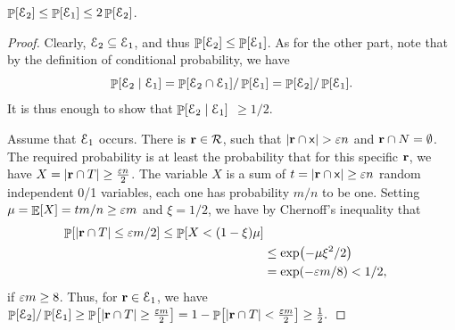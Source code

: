 
\begin{claim}
    $\Prob{\Event_2} \leq \Prob{\Event_1} \leq 2\Prob{\Event_2}$.
\end{claim}

\begin{proof}
    Clearly, $\EuScript{E}_2 \subseteq \EuScript{E}_1$, and thus $\Prob{\Event_2}
    \leq \Prob{\Event_1}$. As for the other part, note that by the
    definition of conditional probability, we have
    \[
        \Prob{ \Event_2 \mid{ \Event_1}} = \Prob{\Event_2 \cap
           \Event_1} / \Prob{\Event_1} = \Prob{\Event_2} /
        \Prob{\Event_1}.
    \]
    It is thus enough to show that $\Prob{\Event_2 \mid{\Event_1}}$
    $\geq 1/2$.
    
    Assume that $\EuScript{E}_1$ occurs. There is $\mathbf{r} \in {\mathcal{R}}$,
    such that $\left| {\mathbf{r} \cap \mathsf{x}} \right| > {\varepsilon} n$ and
    $\mathbf{r} \cap N = \emptyset$.  The required probability is at least
    the probability that for this specific $\mathbf{r}$, we have
    $X = \left| { \mathbf{r} \cap T} \right| \geq \tfrac{{\varepsilon} n}{2}$. The variable
    $X$ is a sum of $t = \left| {\mathbf{r} \cap \mathsf{x}} \right| \geq {\varepsilon} n$
    random independent 0/1 variables, each one has probability $m/n$
    to be one. Setting $\mu = \mathop{\mathbb{E}}\!\left[ {X} \right] = t m/n \geq {\varepsilon} m$ and
    $\xi = 1/2$, we have by Chernoff's inequality that
    \begin{align*}
      \Prob{ \cardin{\range \cap T} \leq \eps m /2} %
      \leq%
      \Prob{ X  < (1-\xi) \mu }%
      \\&
      \leq%
      \exp \pth{ - \mu \xi^2 / 2 }%
      \\&
      =%
      \exp \pth{ - \eps m / 8 }%
      < %
      1/2,
    \end{align*}
    if ${\varepsilon} m \geq 8$.  Thus, for $\mathbf{r} \in \EuScript{E}_1$, we have
    \begin{math}
        \Prob{\Event_2} / \Prob{\Event_1} \geq \Prob{\cardin{ \range
              \cap T} \geq \tfrac{\eps m}{2}} = 1 -\Prob{
           \cardin{\range \cap T} < \frac{\eps m}{2} } \geq
        \frac{1}{2}.
    \end{math}
\end{proof}


